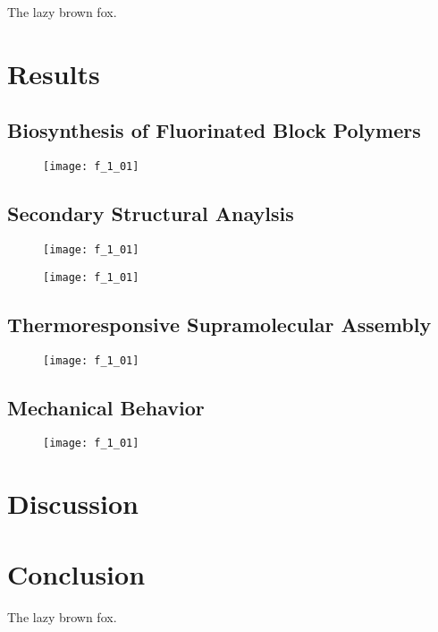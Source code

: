 The lazy brown fox.

\section{Results}

\subsection{Biosynthesis of Fluorinated Block Polymers}

\begin{figure}[h]
    \centering
    \texttt{[image: f\_1\_01]}
    \caption{}
    \label{fig:biosynthesis_report}
\end{figure}

\subsection{Secondary Structural Anaylsis}

\begin{figure}[h]
    \centering
    \texttt{[image: f\_1\_01]}
    \caption{}
    \label{fig:CD_temp_wl}
\end{figure}

\begin{figure}[h]
    \centering
    \texttt{[image: f\_1\_01]}
    \caption{}
    \label{fig:CD_computation}
\end{figure}

\subsection{Thermoresponsive Supramolecular Assembly}

\begin{figure}[h]
    \centering
    \texttt{[image: f\_1\_01]}
    \caption{}
    \label{fig:lcst}
\end{figure}

\subsection{Mechanical Behavior}

\begin{figure}[h]
    \centering
    \texttt{[image: f\_1\_01]}
    \caption{}
    \label{fig:rheology}
\end{figure}

\section{Discussion}

\section{Conclusion}

The lazy brown fox.

\printbibliography
